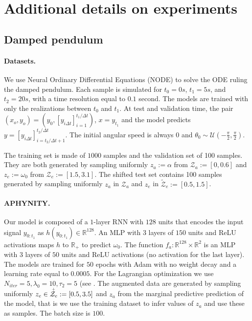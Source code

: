 \documentclass{article}
\begin{document}
\section{Additional details on experiments}\label{app:exp_details}
\subsection{Damped pendulum}
\paragraph{Datasets.}
We use Neural Ordinary Differential Equations (NODE) \citep{NODE} to solve the ODE ruling the damped pendulum. Each sample is simulated for $t_0=0s$, $t_1=5s$, and $t_2=20s$, with a time resolution equal to $0.1$ second. The models are trained with only the realizations between $t_0$ and $t_1$. At test and validation time, the pair $(x_o, y_o) = (y_0, [y_{i\Delta t}]_{i=1}^{t_1 \!/\! \Delta t})$, $x=y_{t_1}$ and the model predicts $y=[y_{i\Delta t}]_{i=t_2 \!/\! \Delta t + 1}^{t_2 \!/\! \Delta t}$. The initial angular speed is always $0$ and $\theta_0 \sim \mathcal{U}(-\frac{\pi}{2}, \frac{\pi}{2})$.

The training set is made of $1000$ samples and the validation set of 100 samples. They are both generated by sampling uniformly $z_a := \alpha$ from $\mathcal{Z}_a := \left[ 0, 0.6 \right]$ and $z_e := \omega_0$ from $\mathcal{Z}_e := \left[ 1.5, 3.1 \right]$. The shifted test set contains 100 samples generated by sampling uniformly $z_a$ in $\mathcal{Z}_a$ and $z_e$ in $\tilde{\mathcal{Z}}_e := \left[0.5, 1.5 \right]$.
\paragraph{APHYNITY.}
Our model is composed of a $1$-layer RNN with $128$ units that encodes the input signal $y_{0:t_1}$ as $h(y_{0:t_1}) \in \mathbb{R}^{128}$. An MLP with $3$ layers of $150$ units and ReLU activations maps $h$ to $\mathbb{R}_+$ to predict $\omega_0$. The function $f_a: \mathbb{R}^{128} \times \mathbb{R}^2$ is an MLP with $3$ layers of $50$ units and ReLU activations (no activation for the last layer). The models are trained for $50$ epochs with Adam with no weight decay and a learning rate equal to $0.0005$. For the Lagrangian optimization we use $N_{iter}=5, \lambda_0=10, \tau_2 = 5$ (see \citep{APHYNITY}. The augmented data are generated by sampling uniformly $z_e \in \accentset{+}{\mathcal{Z}}_e := \left[0.5, 3.5\right]$ and $z_a$ from the marginal predictive prediction of the model, that is we use the training dataset to infer values of $z_a$ and use these as samples. The batch size is $100$.
\end{document}
